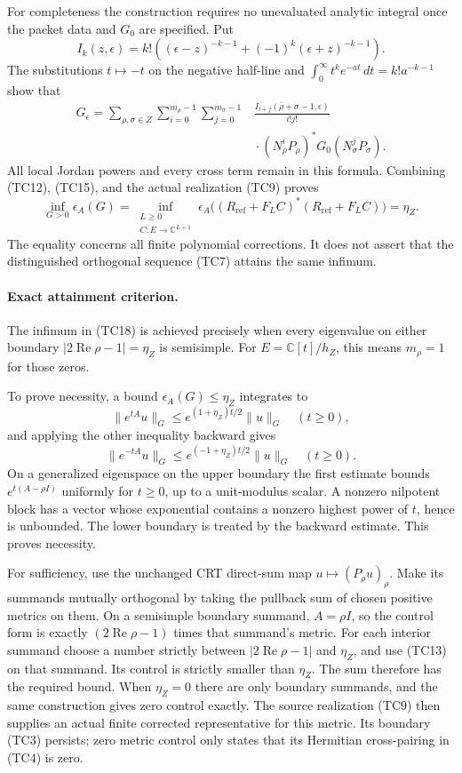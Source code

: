 For completeness the construction requires no unevaluated analytic
integral once the packet data and \(G_0\) are specified.  Put
\[
 I_k(z,\epsilon)
  =k!\left((\epsilon-z)^{-k-1}
              +(-1)^k(\epsilon+z)^{-k-1}\right).
 \tag{TC16}
\]
The substitutions \(t\mapsto-t\) on the negative half-line and
\(\int_0^\infty t^ke^{-at}\,dt=k!a^{-k-1}\) show that
\[
 \begin{split}
 G_\epsilon
 =\sum_{\rho,\sigma\in Z}
   \sum_{i=0}^{m_\rho-1}\sum_{j=0}^{m_\sigma-1}
 &\frac{I_{i+j}(\overline\rho+\sigma-1,\epsilon)}{i!j!}\\[-2mm]
 &{}\cdot(N_\rho^iP_\rho)^*G_0(N_\sigma^jP_\sigma).
 \end{split}
 \tag{TC17}
\]
All local Jordan powers and every cross term remain in this formula.
Combining (TC12), (TC15), and the actual realization (TC9) proves
\[
 \boxed{\inf_{G>0}\epsilon_A(G)
      =\inf_{\substack{L\geq0\\ C:E\to\mathbb C^{L+1}}}
           \epsilon_A\bigl((R_{\mathrm{ref}}+F_LC)^*(R_{\mathrm{ref}}+F_LC)\bigr)
      =\eta_Z.}
 \tag{TC18}
\]
The equality concerns all finite polynomial corrections.  It does
not assert that the distinguished orthogonal sequence (TC7) attains
the same infimum.

\paragraph{Exact attainment criterion.}
The infimum in (TC18) is achieved precisely when every eigenvalue
on either boundary
\(|2\operatorname{Re}\rho-1|=\eta_Z\) is semisimple.
For \(E=\mathbb C[t]/h_Z\), this means \(m_\rho=1\) for those zeros.

To prove necessity, a bound \(\epsilon_A(G)\leq\eta_Z\) integrates to
\[
 \|e^{tA}u\|_G
      \leq e^{(1+\eta_Z)t/2}\|u\|_G\quad(t\geq0),
\]
and applying the other inequality backward gives
\[
 \|e^{-tA}u\|_G
      \leq e^{(-1+\eta_Z)t/2}\|u\|_G\quad(t\geq0).
\]
On a generalized eigenspace on the upper boundary the first estimate
bounds \(e^{t(A-\rho I)}\) uniformly for \(t\geq0\), up to a
unit-modulus scalar.  A nonzero nilpotent block has a vector whose
exponential contains a nonzero highest power of \(t\), hence is
unbounded.  The lower boundary is treated by the backward estimate.
This proves necessity.

For sufficiency, use the unchanged CRT direct-sum map
\(u\mapsto(P_\rho u)_\rho\).
Make its summands mutually orthogonal by taking the pullback sum of
chosen positive metrics on them.  On a semisimple boundary summand,
\(A=\rho I\), so the control form is exactly
\((2\operatorname{Re}\rho-1)\) times that summand's metric.
For each interior summand choose a number strictly between
\(|2\operatorname{Re}\rho-1|\) and \(\eta_Z\), and use (TC13) on that
summand.  Its control is strictly smaller than \(\eta_Z\).
The sum therefore has the required bound.  When \(\eta_Z=0\)
there are only boundary summands, and the same construction gives
zero control exactly.  The source realization (TC9) then supplies
an actual finite corrected representative for this metric.
Its boundary (TC3) persists; zero metric control only states that its
Hermitian cross-pairing in (TC4) is zero.

